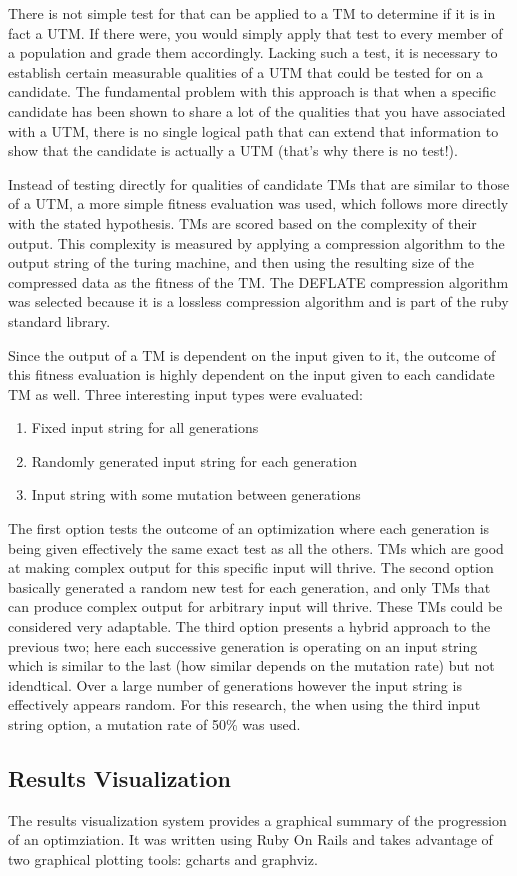 There is not simple test for that can be applied to a TM to determine if it is in fact a UTM. If there were, you would simply apply that test to every member of a population and grade them accordingly. Lacking such a test, it is necessary to establish certain measurable qualities of a UTM that could be tested for on a candidate. The fundamental problem with this approach is that when a specific candidate has been shown to share a lot of the qualities that you have associated with a UTM, there is no single logical path that can extend that information to show that the candidate is actually a UTM (that's why there is no test!). 

Instead of testing directly for qualities of candidate TMs that are similar to those of a UTM, a more simple fitness evaluation was used, which follows more directly with the stated hypothesis. TMs are scored based on the complexity of their output. This complexity is measured by applying a compression algorithm to the output string of the turing machine, and then using the resulting size of the compressed data as the fitness of the TM. The DEFLATE compression algorithm was selected because it is a lossless compression algorithm and is part of the ruby standard library.

Since the output of a TM is dependent on the input given to it, the outcome of this fitness evaluation is highly dependent on the input given to each candidate TM as well. Three interesting input types were evaluated: 

\begin{enumerate}
	\item Fixed input string for all generations
	\item Randomly generated input string for each generation
	\item Input string with some mutation between generations
\end{enumerate}

The first option tests the outcome of an optimization where each generation is being given effectively the same exact test as all the others. TMs which are good at making complex output for this specific input will thrive. The second option basically generated a random new test for each generation, and only TMs that can produce complex output for arbitrary input will thrive. These TMs could be considered very adaptable. The third option presents a hybrid approach to the previous two; here each successive generation is operating on an input string which is similar to the last (how similar depends on the mutation rate) but not idendtical. Over a large number of generations however the input string is effectively appears random. For this research, the when using the third input string option, a mutation rate of 50\% was used. 

\subsection{Results Visualization}

The results visualization system provides a graphical summary of the progression of an optimziation. It was written using Ruby On Rails and takes advantage of two graphical plotting tools: gcharts and graphviz.
